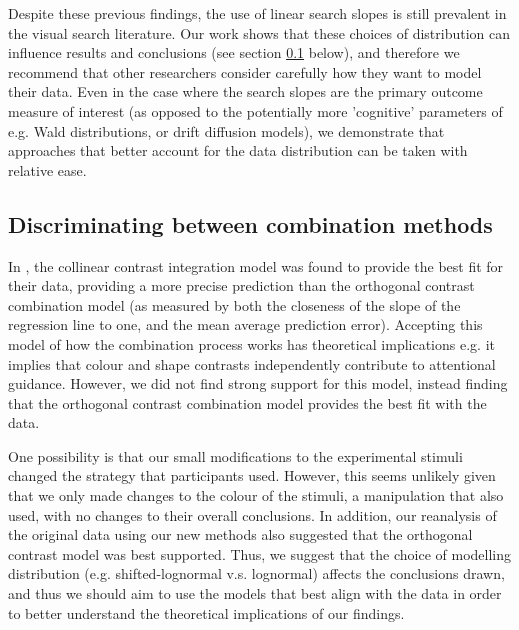 \documentclass[preprint,12pt,authoryear]{elsarticle}
\begin{document}
Despite these previous findings, the use of linear search slopes is still prevalent in the visual search literature. Our work shows that these choices of distribution can influence results and conclusions (see section \ref{sec:dis_combmethods} below), and therefore we recommend that other researchers consider carefully how they want to model their data. Even in the case where the search slopes are the primary outcome measure of interest (as opposed to the potentially more 'cognitive' parameters of e.g. Wald distributions, or drift diffusion models), we demonstrate that approaches that better account for the data distribution can be taken with relative ease.


\subsection{Discriminating between combination methods}
\label{sec:dis_combmethods}

In \cite{buetti2019predicting}, the collinear contrast integration model was found to provide the best fit for their data, providing a more precise prediction than the orthogonal contrast combination model (as measured by both the closeness of the slope of the regression line to one, and the mean average prediction error). Accepting this model of how the combination process works has theoretical implications e.g. it implies that colour and shape contrasts independently contribute to attentional guidance. However, we did not find strong support for this model, instead finding that the orthogonal contrast combination model provides the best fit with the data.

One possibility is that our small modifications to the experimental stimuli changed the strategy that participants used. However, this seems unlikely given that we only made changes to the colour of the stimuli, a manipulation that \cite{buetti2019predicting} also used, with no changes to their overall conclusions. In addition, our reanalysis of the original \citep{buetti2019predicting} data using our new methods also suggested that the orthogonal contrast model was best supported.  Thus, we suggest that the choice of modelling distribution (e.g. shifted-lognormal v.s. lognormal) affects the conclusions drawn, and thus we should aim to use the models that best align with the data in order to better understand the theoretical implications of our findings.
\end{document}
